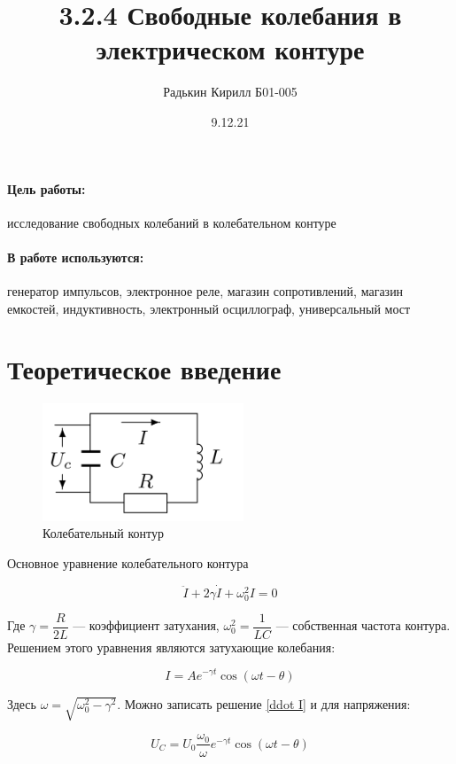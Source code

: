 \documentclass[a4paper, 12pt]{article}
\author{Радькин Кирилл Б01-005}
\title{3.2.4 Свободные колебания в электрическом контуре}
\date{9.12.21}
\newcommand{\parag}[1]{\paragraph*{#1:}}
\begin{document}
    \maketitle

    \parag{Цель работы} исследование свободных колебаний в колебательном контуре
    
    \parag{В работе используются} генератор импульсов, электронное реле, магазин сопротивлений, магазин емкостей, индуктивность, электронный осциллограф, универсальный мост

    \section*{Теоретическое введение}

    \begin{figure} 
        \includegraphics[width=6cm]{RLC}
        \caption{Колебательный контур}
        \label{RLC}
    \end{figure}

    Основное уравнение колебательного контура 

    \begin{equation}\label{ddot I}
    \ddot{I} + 2\gamma\dot{I} + \omega_0^2I = 0
    \end{equation}

    Где $ \gamma = \dfrac{R}{2L} $ --- коэффициент затухания, $ \omega_0^2 = \dfrac{1}{LC} $ --- собственная частота контура. Решением этого уравнения являются затухающие колебания:

    \begin{equation}\label{}
    I = A e^{-\gamma t} \cos (\omega t - \theta)
    \end{equation}

    Здесь $ \omega = \sqrt{\omega_0^2 - \gamma^2} $. Можно записать решение \eqref{ddot I} и для напряжения:

    \begin{equation}\label{}
    U_C = U_0 \dfrac{\omega_0}{\omega} e^{-\gamma t}\cos (\omega t - \theta)
    \end{equation}
\end{document}
